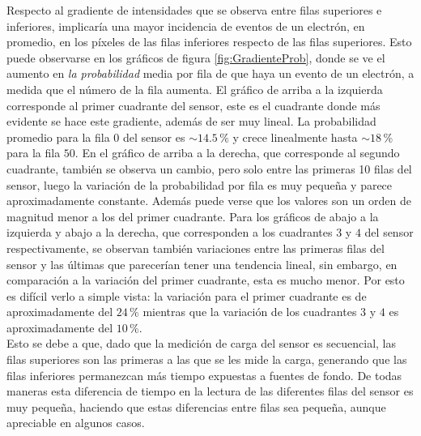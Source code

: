 Respecto al gradiente de intensidades que se observa entre filas superiores e inferiores, implicaría una mayor incidencia de eventos de un electrón, en promedio, en los píxeles de las filas inferiores respecto de las filas superiores. Esto puede observarse en los gráficos de figura \ref{fig:GradienteProb}, donde se ve el aumento en \textit{la probabilidad} media por fila de que haya un evento de un electrón, a medida que el número de la fila aumenta. El gráfico de arriba a la izquierda corresponde al primer cuadrante del sensor, este es el cuadrante donde más evidente se hace este gradiente, además de ser muy lineal. La probabilidad promedio para la fila $0$ del sensor es $\sim 14.5\,\%$ y crece linealmente hasta $\sim 18\,\%$ para la fila $50$. En el gráfico de arriba a la derecha, que corresponde al segundo cuadrante, también se observa un cambio, pero solo entre las primeras 10 filas del sensor, luego la variación de la probabilidad por fila es muy pequeña y parece aproximadamente constante. Además puede verse que los valores son un orden de magnitud menor a los del primer cuadrante. Para los gráficos de abajo a la izquierda y abajo a la derecha, que corresponden a los cuadrantes $3$ y $4$ del sensor respectivamente, se observan también variaciones entre las primeras filas del sensor y las últimas que parecerían tener una tendencia lineal, sin embargo, en comparación a la variación del primer cuadrante, esta es mucho menor. Por esto es difícil verlo a simple vista: la variación para el primer cuadrante es de aproximadamente del $24\,\%$ mientras que la variación de los cuadrantes $3$ y $4$ es aproximadamente del $10\,\%$.\\
\indent Esto se debe a que, dado que la medición de carga del sensor es secuencial, las filas superiores son las primeras a las que se les mide la carga, generando que las filas inferiores permanezcan más tiempo expuestas a fuentes de fondo. De todas maneras esta diferencia de tiempo en la lectura de las diferentes filas del sensor es muy pequeña, haciendo que estas diferencias entre filas sea pequeña, aunque apreciable en algunos casos.\\

